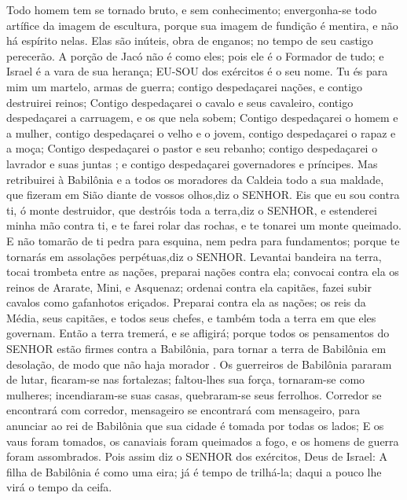{Todo homem tem se tornado bruto, e sem conhecimento; envergonha-se todo artífice da imagem de escultura, porque sua imagem de fundição é mentira, e não há espírito nelas.
Elas são inúteis, obra de enganos; no tempo de seu castigo perecerão.
A porção de Jacó não é como eles; pois ele é o Formador de tudo; e Israel é a vara de sua herança; EU-SOU dos exércitos é o seu nome.
Tu és para mim um martelo,
{} armas de guerra; contigo despedaçarei nações, e contigo destruirei reinos;
Contigo despedaçarei o cavalo e seus cavaleiro, contigo despedaçarei a carruagem, e os que nela sobem;
Contigo despedaçarei o homem e a mulher, contigo despedaçarei o velho e o jovem, contigo despedaçarei o rapaz e a moça;
Contigo despedaçarei o pastor e seu rebanho; contigo despedaçarei o lavrador e suas juntas
{} ; e contigo despedaçarei governadores e príncipes.
Mas retribuirei à Babilônia e a todos os moradores da Caldeia todo a sua maldade, que fizeram em Sião diante de vossos olhos,diz o SENHOR.
Eis que eu sou contra ti, ó monte destruidor, que destróis toda a terra,diz o SENHOR, e estenderei minha mão contra ti, e te farei rolar das rochas, e te tonarei um monte queimado.
E não tomarão de ti pedra para esquina, nem pedra para fundamentos; porque te tornarás em assolações perpétuas,diz o SENHOR.
Levantai bandeira na terra, tocai trombeta entre as nações, preparai nações contra ela; convocai contra ela os reinos de Ararate, Mini, e Asquenaz; ordenai contra ela capitães, fazei subir cavalos como gafanhotos eriçados.
Preparai contra ela as nações; os reis da Média, seus capitães, e todos seus chefes, e também toda a terra em que eles governam.
Então a terra tremerá, e se afligirá; porque todos os pensamentos do SENHOR estão firmes contra a Babilônia, para tornar a terra de Babilônia em desolação, de modo que não haja morador
{} .
Os guerreiros de Babilônia pararam de lutar, ficaram-se nas fortalezas; faltou-lhes sua força, tornaram-se como mulheres; incendiaram-se suas casas, quebraram-se seus ferrolhos.
Corredor se encontrará com corredor, mensageiro se encontrará com mensageiro, para anunciar ao rei de Babilônia que sua cidade é tomada por todas os lados;
E os vaus foram tomados, os canaviais foram queimados a fogo, e os homens de guerra foram assombrados.
Pois assim diz o SENHOR dos exércitos, Deus de Israel: A filha de Babilônia é como uma eira; já é tempo de trilhá-la; daqui a pouco lhe virá o tempo da ceifa.
}
